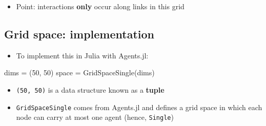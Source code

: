\documentclass[
  letterpaper,
  DIV=11,
  numbers=noendperiod]{scrartcl}
\newenvironment{Shaded}{\begin{snugshade}}{\end{snugshade}}
\newcommand{\FloatTok}[1]{\textcolor[rgb]{0.68,0.00,0.00}{#1}}
\newcommand{\FunctionTok}[1]{\textcolor[rgb]{0.28,0.35,0.67}{#1}}
\newcommand{\NormalTok}[1]{\textcolor[rgb]{0.00,0.23,0.31}{#1}}
\newcommand{\OperatorTok}[1]{\textcolor[rgb]{0.37,0.37,0.37}{#1}}
\providecommand{\tightlist}{%
  \setlength{\itemsep}{0pt}\setlength{\parskip}{0pt}}\usepackage{longtable,booktabs,array}
\begin{document}
\begin{itemize}
\tightlist
\item
  Point: interactions \textbf{only} occur along links in this grid
\end{itemize}

\subsection{Grid space: implementation}\label{grid-space-implementation}

\begin{itemize}
\tightlist
\item
  To implement this in Julia with Agents.jl:
\end{itemize}

\begin{Shaded}
\begin{Highlighting}[]
\NormalTok{dims }\OperatorTok{=}\NormalTok{ (}\FloatTok{50}\NormalTok{, }\FloatTok{50}\NormalTok{)}
\NormalTok{space }\OperatorTok{=} \FunctionTok{GridSpaceSingle}\NormalTok{(dims)}
\end{Highlighting}
\end{Shaded}

\begin{itemize}
\tightlist
\item
  \texttt{(50,\ 50)} is a data structure known as a \textbf{tuple}
\item
  \texttt{GridSpaceSingle} comes from Agents.jl and defines a grid space
  in which each node can carry at most one agent (hence,
  \texttt{Single})
\end{itemize}
\end{document}
